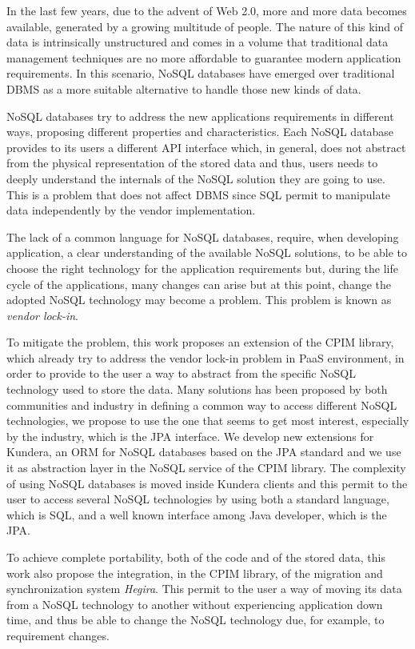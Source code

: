 In the last few years, due to the advent of Web 2.0, more and more data becomes available, generated by a growing multitude of people. The nature of this kind of data is intrinsically unstructured and comes in a volume that traditional data management techniques are no more affordable to guarantee modern application requirements.
In this scenario, NoSQL databases have emerged over traditional DBMS as a more suitable alternative to handle those new kinds of data.

\noindent NoSQL databases try to address the new applications requirements in different ways, proposing different properties and characteristics. Each NoSQL database provides to its users a different API interface which, in general, does not abstract from the physical representation of the stored data and thus, users needs to deeply understand the internals of the NoSQL solution they are going to use. This is a problem that does not affect DBMS since SQL permit to manipulate data independently by the vendor implementation. 

\noindent The lack of a common language for NoSQL databases, require, when developing application, a clear understanding of the available NoSQL solutions, to be able to choose the right technology for the application requirements but, during the life cycle of the applications, many changes can arise but at this point, change the adopted NoSQL technology may become a problem. This problem is known as \textit{vendor lock-in}.  

\noindent To mitigate the problem, this work proposes an extension of the CPIM library, which already try to address the vendor lock-in problem in PaaS environment, in order to provide to the user a way to abstract from the specific NoSQL technology used to store the data.
Many solutions has been proposed by both communities and industry in defining a common way to access different NoSQL technologies, we propose to use the one that seems to get most interest, especially by the industry, which is the JPA interface. We develop new extensions for Kundera, an ORM for NoSQL databases based on the JPA standard and we use it as abstraction layer in the NoSQL service of the CPIM library.
The complexity of using NoSQL databases is moved inside Kundera clients and this permit to the user to access several NoSQL technologies by using both a standard language, which is SQL, and a well known interface among Java developer, which is the JPA.

\noindent To achieve complete portability, both of the code and of the stored data, this work also propose the integration, in the CPIM library, of the migration and synchronization system \textit{Hegira}. This permit to the user a way of moving its data from a NoSQL technology to another without experiencing application down time, and thus be able to change the NoSQL technology due, for example, to requirement changes.
 
